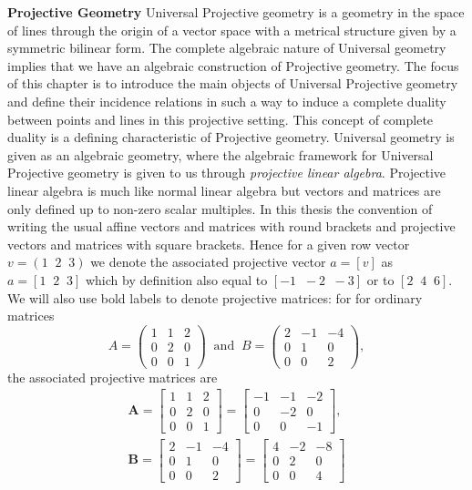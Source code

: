 \documentclass{unswthesis}
\begin{document}
\textbf{Projective Geometry} Universal Projective geometry is a geometry in
the space of lines through the origin of a vector space with a metrical
structure given by a symmetric bilinear form.\newline
The complete algebraic nature of Universal geometry implies that we have an
algebraic construction of Projective geometry. The focus of this chapter is
to introduce the main objects of Universal Projective geometry and define
their incidence relations in such a way to induce a complete duality between
points and lines in this projective setting. This concept of complete
duality is a defining characteristic of Projective geometry.\newline
Universal geometry is given as an algebraic geometry, where the algebraic
framework for Universal Projective geometry is given to us through \textit{%
projective linear algebra}. Projective linear algebra is much like normal
linear algebra but vectors and matrices are only defined up to non-zero
scalar multiples. In this thesis the convention of writing the usual affine
vectors and matrices with round brackets and projective vectors and matrices
with square brackets. Hence for a given row vector $v=(1\;\;2\;\;3)$ we
denote the associated projective vector $a=[v]$ as $a=[1\;\;2\;\;3]$ which
by definition also equal to $[-1\;\;-2\;\;-3]$ or to $[2\;\;4\;\;6]$. We
will also use bold labels to denote projective matrices: for for ordinary
matrices 
\begin{equation*}
A=%
\begin{pmatrix}
1 & 1 & 2 \\ 
0 & 2 & 0 \\ 
0 & 0 & 1%
\end{pmatrix}
\;\;\text{and}\;\; B=%
\begin{pmatrix}
2 & -1 & -4 \\ 
0 & 1 & 0 \\ 
0 & 0 & 2%
\end{pmatrix}%
, 
\end{equation*}
the associated projective matrices are 
\begin{align*}
\mathbf{A}=%
\begin{bmatrix}
1 & 1 & 2 \\ 
0 & 2 & 0 \\ 
0 & 0 & 1%
\end{bmatrix}%
= 
\begin{bmatrix}
-1 & -1 & -2 \\ 
0 & -2 & 0 \\ 
0 & 0 & -1%
\end{bmatrix}%
, \\
\mathbf{B}=%
\begin{bmatrix}
2 & -1 & -4 \\ 
0 & 1 & 0 \\ 
0 & 0 & 2%
\end{bmatrix}%
= 
\begin{bmatrix}
4 & -2 & -8 \\ 
0 & 2 & 0 \\ 
0 & 0 & 4%
\end{bmatrix}%
\end{align*}
\end{document}
